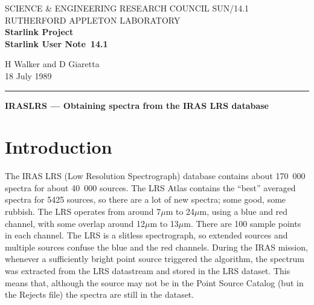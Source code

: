 \pagestyle{myheadings}

\newcommand{\stardoccategory}  {Starlink User Note}
\newcommand{\stardocinitials}  {SUN}
\newcommand{\stardocnumber}    {14.1}
\newcommand{\stardocauthors}   {H Walker and D Giaretta}
\newcommand{\stardocdate}      {18 July 1989}
\newcommand{\stardoctitle}     {IRASLRS --- Obtaining spectra from the IRAS LRS database}

\newcommand{\stardocname}{\stardocinitials /\stardocnumber}
\markright{\stardocname}
\setlength{\textwidth}{160mm}
\setlength{\textheight}{240mm}
\setlength{\topmargin}{-5mm}
\setlength{\oddsidemargin}{0mm}
\setlength{\evensidemargin}{0mm}
\setlength{\parindent}{0mm}
\setlength{\parskip}{\medskipamount}
\setlength{\unitlength}{1mm}


\thispagestyle{empty}
SCIENCE \& ENGINEERING RESEARCH COUNCIL \hfill \stardocname\\
RUTHERFORD APPLETON LABORATORY\\
{\large\bf Starlink Project\\}
{\large\bf \stardoccategory\ \stardocnumber}
\begin{flushright}
\stardocauthors\\
\stardocdate
\end{flushright}
\vspace{-4mm}
\rule{\textwidth}{0.5mm}
\vspace{5mm}
\begin{center}
{\Large\bf \stardoctitle}
\end{center}
\vspace{5mm}

\section{Introduction}
The IRAS LRS (Low Resolution Spectrograph) database contains about 
170~000 spectra for about 40~000 sources. 
The LRS Atlas contains the ``best'' averaged spectra for 5425 sources, so 
there are a lot of new spectra; some good, some rubbish.
The LRS operates from around 7$\mu$m to 24$\mu$m, using a blue and red
channel, with some overlap around 12$\mu$m to 13$\mu$m. 
There are 100 sample points in each channel.
The LRS is a slitless spectrograph, so extended sources and multiple sources
confuse the blue and the red channels.
During the IRAS mission, whenever a sufficiently bright point source 
triggered the algorithm, the spectrum was extracted from the LRS datastream
and stored in the LRS dataset. 
This means that, although the source may not be in the Point Source Catalog
(but in the Rejects file) the spectra are still in the dataset. 

